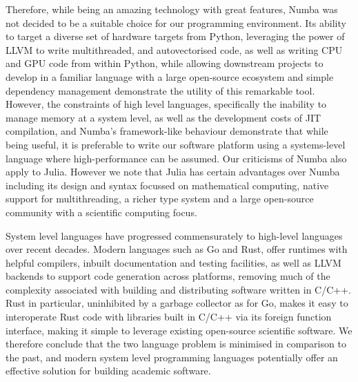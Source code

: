 Therefore, while being an amazing technology with great features, Numba was not decided to be a suitable choice for our programming environment. Its ability to target a diverse set of hardware targets from Python, leveraging the power of LLVM to write multithreaded, and autovectorised code, as well as writing CPU and GPU code from within Python, while allowing downstream projects to develop in a familiar language with a large open-source ecosystem and simple dependency management demonstrate the utility of this remarkable tool. However, the constraints of high level languages, specifically the inability to manage memory at a system level, as well as the development costs of JIT compilation, and Numba's framework-like behaviour demonstrate that while being useful, it is preferable to write our software platform using a systems-level language where high-performance can be assumed. Our criticisms of Numba also apply to Julia. However we note that Julia has certain advantages over Numba including its design and syntax focussed on mathematical computing, native support for multithreading, a richer type system and a large open-source community with a scientific computing focus.

System level languages have progressed commensurately to high-level languages over recent decades. Modern languages such as Go and Rust, offer runtimes with helpful compilers, inbuilt documentation and testing facilities, as well as LLVM backends to support code generation across platforms, removing much of the complexity associated with building and distributing software written in C/C++. Rust in particular, uninhibited by a garbage collector as for Go, makes it easy to interoperate Rust code with libraries built in C/C++ via its foreign function interface, making it simple to leverage existing open-source scientific software.  We therefore conclude that the two language problem is minimised in comparison to the past, and modern system level programming languages potentially offer an effective solution for building academic software.

